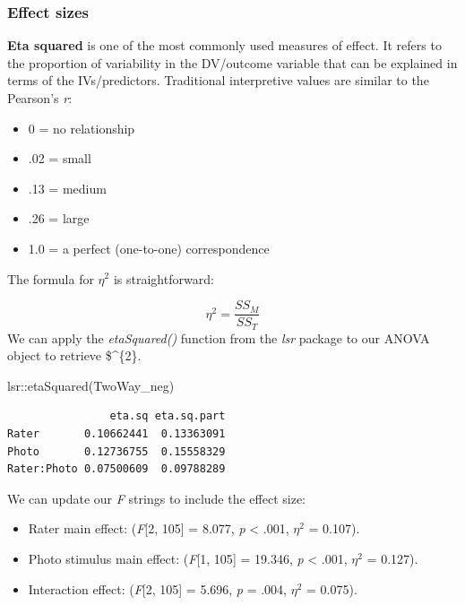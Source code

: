 \documentclass[
  11pt,
]{book}
\newenvironment{Shaded}{\begin{snugshade}}{\end{snugshade}}
\newcommand{\FunctionTok}[1]{\textcolor[rgb]{0.00,0.00,0.00}{#1}}
\newcommand{\NormalTok}[1]{#1}
\newcommand{\SpecialCharTok}[1]{\textcolor[rgb]{0.00,0.00,0.00}{#1}}
\providecommand{\tightlist}{%
  \setlength{\itemsep}{0pt}\setlength{\parskip}{0pt}}
\begin{document}
\hypertarget{effect-sizes}{%
\subsubsection{Effect sizes}\label{effect-sizes}}

\textbf{Eta squared} is one of the most commonly used measures of effect. It refers to the proportion of variability in the DV/outcome variable that can be explained in terms of the IVs/predictors. Traditional interpretive values are similar to the Pearson's \emph{r}:

\begin{itemize}
\tightlist
\item
  0 = no relationship
\item
  .02 = small
\item
  .13 = medium
\item
  .26 = large
\item
  1.0 = a perfect (one-to-one) correspondence
\end{itemize}

The formula for \(\eta ^{2}\) is straightforward:

\[\eta ^{2}=\frac{SS_{M}}{SS_{T}}\]
We can apply the \emph{etaSquared()} function from the \emph{lsr} package to our ANOVA object to retrieve \$\eta \^{}\{2\}.

\begin{Shaded}
\begin{Highlighting}[]
\NormalTok{lsr}\SpecialCharTok{::}\FunctionTok{etaSquared}\NormalTok{(TwoWay\_neg)}
\end{Highlighting}
\end{Shaded}

\begin{verbatim}
                eta.sq eta.sq.part
Rater       0.10662441  0.13363091
Photo       0.12736755  0.15558329
Rater:Photo 0.07500609  0.09788289
\end{verbatim}

We can update our \emph{F} strings to include the effect size:

\begin{itemize}
\tightlist
\item
  Rater main effect: (\emph{F}{[}2, 105{]} = 8.077, \emph{p} \textless{} .001, \(\eta ^{2}\) = 0.107).
\item
  Photo stimulus main effect: (\emph{F}{[}1, 105{]} = 19.346, \emph{p} \textless{} .001, \(\eta ^{2}\) = 0.127).
\item
  Interaction effect: (\emph{F}{[}2, 105{]} = 5.696, \emph{p} = .004, \(\eta ^{2}\) = 0.075).
\end{itemize}
\end{document}
